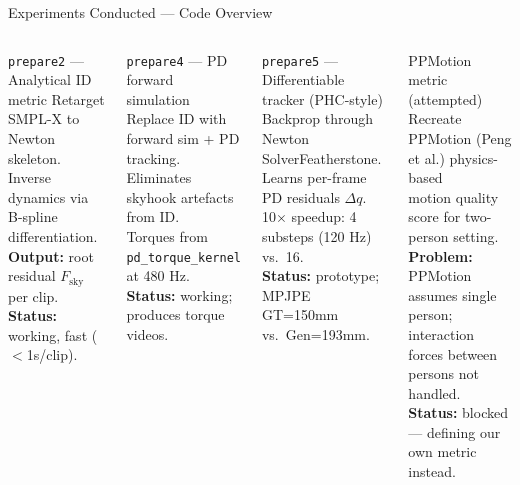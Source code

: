 \documentclass[aspectratio=169, 10pt]{beamer}
\begin{document}
\begin{frame}{Experiments Conducted --- Code Overview}
  \begin{columns}[T]
      \begin{block}{\texttt{prepare2} --- Analytical ID metric}
        \small
        Retarget SMPL-X to Newton skeleton.\\
        Inverse dynamics via B-spline differentiation.\\
        \textbf{Output:} root residual $F_\text{sky}$ per clip.\\
        \textbf{Status:} working, fast ($<$1s/clip).
      \end{block}

      \vspace{0.4em}
      \begin{block}{\texttt{prepare4} --- PD forward simulation}
        \small
        Replace ID with forward sim + PD tracking.\\
        Eliminates skyhook artefacts from ID.\\
        Torques from \texttt{pd\_torque\_kernel} at 480 Hz.\\
        \textbf{Status:} working; produces torque videos.
      \end{block}

      \begin{block}{\texttt{prepare5} --- Differentiable tracker (PHC-style)}
        \small
        Backprop through Newton SolverFeatherstone.\\
        Learns per-frame PD residuals $\Delta q$.\\
        10$\times$ speedup: 4 substeps (120 Hz) vs.\ 16.\\
        \textbf{Status:} prototype; MPJPE GT=150mm vs.\ Gen=193mm.
      \end{block}

      \vspace{0.4em}
      \begin{alertblock}{PPMotion metric (attempted)}
        \small
        Recreate PPMotion (Peng et al.) physics-based\\
        motion quality score for two-person setting.\\
        \textbf{Problem:} PPMotion assumes single person;\\
        interaction forces between persons not handled.\\
        \textbf{Status:} blocked --- defining our own metric instead.
      \end{alertblock}
  \end{columns}
\end{frame}
\end{document}
